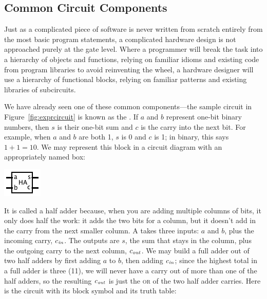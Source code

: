 \subsection{Common Circuit Components}
Just as a complicated piece of software is never written from scratch entirely from the most basic program statements, a complicated hardware design is not approached purely at the gate level. Where a programmer will break the task into a hierarchy of objects and functions, relying on familiar idioms and existing code from program libraries to avoid reinventing the wheel, a hardware designer will use a hierarchy of functional blocks, relying on familiar patterns and existing libraries of subcircuits.

We have already seen one of these common components---the sample circuit in Figure~\ref{fig:exprcircuit} is known as the . If $a$ and $b$ represent one-bit binary numbers, then $s$ is their one-bit sum and $c$ is the carry into the next bit. For example, when $a$ and $b$ are both 1, $s$ is 0 and $c$ is 1; in binary, this says $1+1=10$. We may represent this block in a circuit diagram with an appropriately named box:
\begin{center}
\includegraphics[width=!,height=!,scale=0.75]{graphics/HalfAdderSymbol.png}
\end{center}
It is called a half adder because, when you are adding multiple columns of bits, it only does half the work: it adds the two bits for a column, but it doesn't add in the carry from the next smaller column. A  takes three inputs: $a$ and $b$, plus the incoming carry, $c_\textit{\scriptsize in}$. The outputs are $s$, the sum that stays in the column, plus the outgoing carry to the next column, $c_\textit{\scriptsize out}$. We may build a full adder out of two half adders by first adding $a$ to $b$, then adding $c_\textit{\scriptsize in}$; since the highest total in a full adder is three (11), we will never have a carry out of more than one of the half adders, so the resulting $c_\textit{\scriptsize out}$ is just the \textsc{or} of the two half adder carries. Here is the circuit with its block symbol and its truth table:
